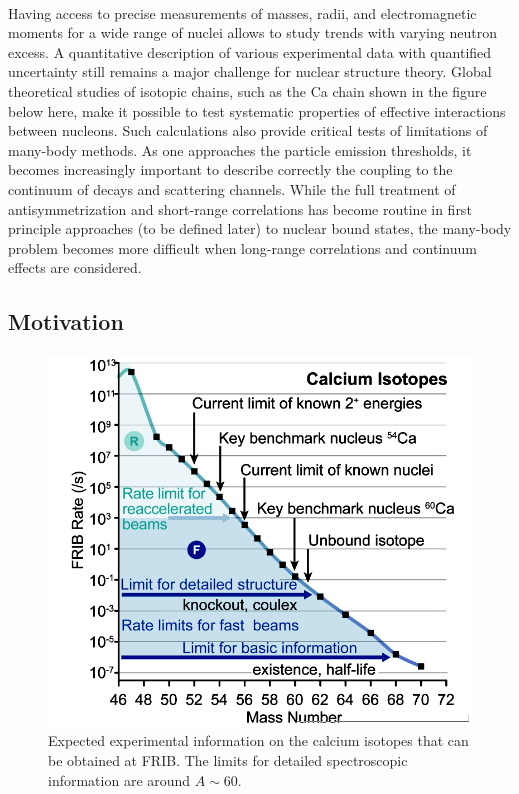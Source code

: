 \documentclass[%
twoside,                 %
final,                   %
10pt]{article}
\begin{document}
\paragraph{}
Having access to precise measurements of masses, radii, and
electromagnetic moments for a wide range of nuclei allows to study
trends with varying neutron excess. A quantitative description of
various experimental data with quantified uncertainty still remains a
major challenge for nuclear structure theory.  Global theoretical
studies of isotopic chains, such as the Ca chain shown in the figure below here, make it possible to test systematic
properties of effective interactions between nucleons. Such calculations also
provide critical tests of limitations of many-body methods. As one
approaches the particle emission thresholds, it becomes increasingly
important to describe correctly the coupling to the continuum of
decays and scattering channels. While the
full treatment of antisymmetrization and short-range correlations has
become routine in first principle  approaches (to be defined later) to nuclear bound states, the
many-body problem becomes more difficult when long-range correlations
and continuum effects are considered.



\subsection*{Motivation}

\paragraph{}


\begin{figure}[ht]
  \centerline{\includegraphics[width=0.6\linewidth]{figslides/careach.png}}
  \caption{
  Expected experimental information on the calcium isotopes that can be obtained at FRIB. The limits for detailed spectroscopic information are around $A\sim 60$.
  }
\end{figure}
\end{document}
